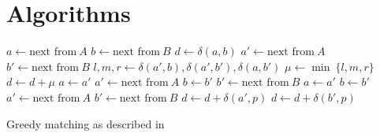 

\appendix

{}	%
{}	%


\section{Algorithms}\label{appendix:algorithms}
\begin{algorithm}[h]
  \begin{algorithmic}
    \State $a \gets \text{next from}~A$
    \State $b \gets \text{next from}~B$
    \State $d \gets \delta(a,b)$
    \State $a' \gets \text{next from}~A$
    \State $b' \gets \text{next from}~B$
      \State $l, m, r \gets \delta(a',b), \delta(a', b'), \delta(a, b')$
      \State $\mu \gets \min ~\{l, m, r\}$
      \State $d \gets d + \mu$
        \State $a \gets a'$
        \State $a' \gets \text{next from}~A$
        \State $b \gets b'$
        \State $b' \gets \text{next from}~B$
      \Else
        \State $a \gets a'$
        \State $b \gets b'$
        \State $a' \gets \text{next from}~A$
        \State $b' \gets \text{next from}~B$
      \EndIf
    \EndWhile
        \State $d \gets d + \delta(a',p)$
      \EndFor
        \State $d \gets d + \delta(b',p)$
      \EndFor
    \EndIf
  \end{algorithmic}
  \caption{Greedy matching as described in \cite{Kirsch}}
  \label{alg:greedy-matching}
\end{algorithm}

